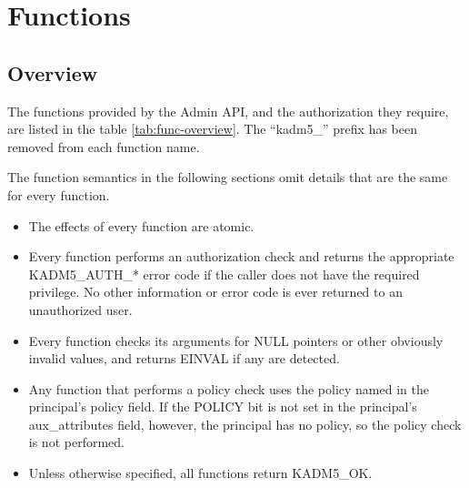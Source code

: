 \section{Functions}

\subsection{Overview}

The functions provided by the Admin API, and the authorization they
require, are listed in the table \ref{tab:func-overview}.  The
``kadm5_'' prefix has been removed from each function name.

The function semantics in the following sections omit details that are
the same for every function.

\begin{itemize}
\item The effects of every function are atomic.

\item Every function performs an authorization check and returns
the appropriate KADM5_AUTH_* error code if the caller does not
have the required privilege.  No other information or error code is
ever returned to an unauthorized user.

\item Every function checks its arguments for NULL pointers or other
obviously invalid values, and returns EINVAL if any are detected.

\item Any function that performs a policy check uses the policy named
in the principal's policy field.  If the POLICY bit is not set in the
principal's aux_attributes field, however, the principal has no
policy, so the policy check is not performed.

\item Unless otherwise specified, all functions return KADM5_OK.
\end{itemize}

